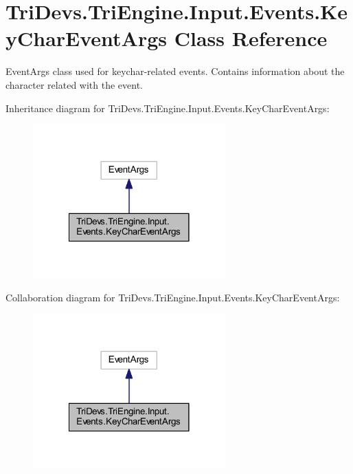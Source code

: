 \hypertarget{class_tri_devs_1_1_tri_engine_1_1_input_1_1_events_1_1_key_char_event_args}{\section{Tri\-Devs.\-Tri\-Engine.\-Input.\-Events.\-Key\-Char\-Event\-Args Class Reference}
\label{class_tri_devs_1_1_tri_engine_1_1_input_1_1_events_1_1_key_char_event_args}
}


Event\-Args class used for keychar-\/related events. Contains information about the character related with the event.  




Inheritance diagram for Tri\-Devs.\-Tri\-Engine.\-Input.\-Events.\-Key\-Char\-Event\-Args\-:
\nopagebreak
\begin{figure}[H]
\begin{center}
\leavevmode
\includegraphics[width=210pt]{class_tri_devs_1_1_tri_engine_1_1_input_1_1_events_1_1_key_char_event_args__inherit__graph}
\end{center}
\end{figure}


Collaboration diagram for Tri\-Devs.\-Tri\-Engine.\-Input.\-Events.\-Key\-Char\-Event\-Args\-:
\nopagebreak
\begin{figure}[H]
\begin{center}
\leavevmode
\includegraphics[width=210pt]{class_tri_devs_1_1_tri_engine_1_1_input_1_1_events_1_1_key_char_event_args__coll__graph}
\end{center}
\end{figure}
